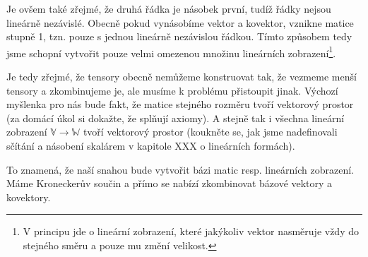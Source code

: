 \documentclass[a5paper,12pt]{amsbook}
\theoremstyle{definition}
\newcommand{\myspace}[1]{\mathbb{#1}}
\begin{document}
Je ovšem také zřejmé, že druhá řádka je násobek první, tudíž řádky nejsou lineárně nezávislé. Obecně
pokud vynásobíme vektor a kovektor, vznikne matice stupně 1, tzn. pouze s jednou lineárně nezávislou
řádkou. Tímto způsobem tedy jsme schopní vytvořit pouze velmi omezenou množinu lineárních
zobrazení\footnote{
    V principu jde o lineární zobrazení, které jakýkoliv vektor nasměruje vždy do stejného
    směru a pouze mu změní velikost.
}.

Je tedy zřejmé, že tensory obecně nemůžeme konstruovat tak, že vezmeme menší tensory a zkombinujeme
je, ale musíme k problému přistoupit jinak. Výchozí myšlenka pro nás bude fakt, že matice stejného
rozměru tvoří vektorový prostor (za domácí úkol si dokažte, že splňují axiomy). A stejně tak
i všechna lineární zobrazení $\myspace{V}\rightarrow\myspace{W}$ tvoří vektorový prostor
(koukněte se, jak jsme nadefinovali sčítání a násobení skalárem v kapitole XXX o lineárních
formách).

To znamená, že naší snahou bude vytvořit bázi matic resp. lineárních zobrazení. Máme Kroneckerův
součin a přímo se nabízí zkombinovat bázové vektory a kovektory.
\end{document}
